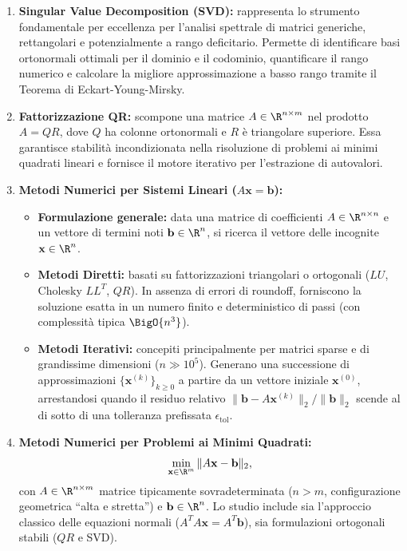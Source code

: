 \begin{enumerate}
    \item \textbf{Singular Value Decomposition (SVD):} rappresenta lo strumento fondamentale per eccellenza per l'analisi spettrale di matrici generiche, rettangolari e potenzialmente a rango deficitario. Permette di identificare basi ortonormali ottimali per il dominio e il codominio, quantificare il rango numerico e calcolare la migliore approssimazione a basso rango tramite il Teorema di Eckart-Young-Mirsky.

    \item \textbf{Fattorizzazione QR:} scompone una matrice $A \in \R^{n \times m}$ nel prodotto $A = QR$, dove $Q$ ha colonne ortonormali e $R$ \`e triangolare superiore. Essa garantisce stabilit\`a incondizionata nella risoluzione di problemi ai minimi quadrati lineari e fornisce il motore iterativo per l'estrazione di autovalori.

    \item \textbf{Metodi Numerici per Sistemi Lineari ($A\mathbf{x} = \mathbf{b}$):}
    \begin{itemize}
        \item \textbf{Formulazione generale:} data una matrice di coefficienti $A \in \R^{n \times n}$ e un vettore di termini noti $\mathbf{b} \in \R^n$, si ricerca il vettore delle incognite $\mathbf{x} \in \R^n$.
        \item \textbf{Metodi Diretti:} basati su fattorizzazioni triangolari o ortogonali ($LU$, Cholesky $LL^T$, $QR$). In assenza di errori di roundoff, forniscono la soluzione esatta in un numero finito e deterministico di passi (con complessit\`a tipica $\BigO{n^3}$).
        \item \textbf{Metodi Iterativi:} concepiti principalmente per matrici sparse e di grandissime dimensioni ($n \gg 10^5$). Generano una successione di approssimazioni $\{\mathbf{x}^{(k)}\}_{k \ge 0}$ a partire da un vettore iniziale $\mathbf{x}^{(0)}$, arrestandosi quando il residuo relativo $\|\mathbf{b} - A\mathbf{x}^{(k)}\|_2 / \|\mathbf{b}\|_2$ scende al di sotto di una tolleranza prefissata $\epsilon_{\text{tol}}$.
    \end{itemize}

    \item \textbf{Metodi Numerici per Problemi ai Minimi Quadrati:}
    \begin{equation}
        \min_{\mathbf{x} \in \R^m} \|A\mathbf{x} - \mathbf{b}\|_2,
    \end{equation}
    con $A \in \R^{n \times m}$ matrice tipicamente sovradeterminata ($n > m$, configurazione geometrica ``alta e stretta'') e $\mathbf{b} \in \R^n$. Lo studio include sia l'approccio classico delle equazioni normali ($A^T A \mathbf{x} = A^T \mathbf{b}$), sia formulazioni ortogonali stabili ($QR$ e SVD).


\end{enumerate}
